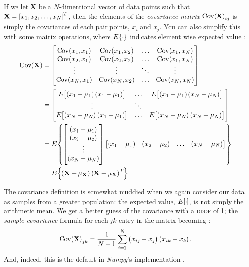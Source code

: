 \documentclass[british]{article}
\newcommand{\Cov}{\mathrm{Cov}\!\del}
\newcommand{\E}{E\!\sbr}
\begin{document}
 If we let $\mathbf X$ be
a $N$-dimentional vector of data points such that $\mathbf X = \sbr{x_1, x_2,
\ldots, x_N}^T$, then the elements of the \emph{covariance matrix}
$\Cov{\mathbf X}_{ij}$ is simply the covariances of each pair points, $x_i$ and
$x_j$. You can also simplify this with some matrix operations, where
$E\!\cbr{\cdot}$ indicates element wise expected value
\autocites[33]{marsland}[711]{devore-berk}:
\begin{align*}
  \Cov{\mathbf X} &=
  \begin{bmatrix}
    \Cov{x_1,x_1} & \Cov{x_1,x_2} & \dots  & \Cov{x_1,x_N} \\
    \Cov{x_2,x_1} & \Cov{x_2,x_2} & \dots  & \Cov{x_1,x_N} \\
    \vdots        & \vdots        & \ddots & \vdots        \\
    \Cov{x_N,x_1} & \Cov{x_N,x_2} & \dots  & \Cov{x_N,x_N}
  \end{bmatrix} \\
  &=
  \begin{bmatrix}
    \E{\del{x_1-\mu_1}\del{x_1-\mu_1}} & \dots  & \E[1]{\del{x_1-\mu_1}\del{x_N-\mu_N}} \\
    \vdots                             & \ddots & \vdots                                \\
    \E{\del{x_N-\mu_N}\del{x_1-\mu_1}} & \dots  & \E[1]{\del{x_N-\mu_N}\del{x_N-\mu_N}}
  \end{bmatrix} \\
  &= E\!
  \left\{
  \begin{matrix}
    \begin{bmatrix}
      \del{x_1-\mu_1} \\ \del{x_2-\mu_2} \\ \vdots \\ \del{x_N-\mu_N}
    \end{bmatrix}
    \begin{bmatrix}
      \del{x_1-\mu_1} & \del{x_2-\mu_2} & \dots  & \del{x_N-\mu_N}
    \end{bmatrix}
  \end{matrix}
  \right\} \\
  &= E\!\cbr{\del{\mathbf X - \mu_{\mathbf X}}\del{\mathbf X - \mu_{\mathbf X}}^T}
\end{align*}

The covariance definition is somewhat muddied when we again consider our data
as samples from a greater population: the expected value, $\E{\cdot}$, is not
simply the arithmetic mean. We get a better guess of the covariance with a
\textsc{ddof} of 1; the \emph{sample covariance} formula for each $jk$-entry in
the matrix becoming \autocite{wiki-sample}:
$$ \Cov{\mathbf X}_{jk}=\frac{1}{N-1}\sum_{i=1}^{N} \del{x_{ij}-\bar{x}_j} \del{x_{ik}-\bar{x}_k}.$$
And, indeed, this is the default in \emph{Numpy}'s implementation
\autocite[\texttt{numpy.cov}]{np}.
\end{document}

